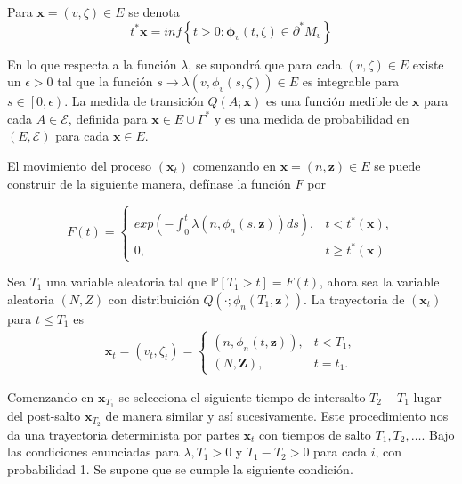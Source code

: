 \documentclass{article}
\newcommand{\prob}{\mathbb{P}}
\begin{document}
Para $\mathbf{x}=\left(v,\zeta\right)\in E$ se denota
\[t^{*}\mathbf{x}=inf\left\{t>0:\mathbf{\phi}_{v}\left(t,\zeta\right)\in\partial^{*}M_{v}\right\}\]

En lo que respecta a la funci\'on $\lambda$, se supondr\'a que
para cada $\left(v,\zeta\right)\in E$ existe un $\epsilon>0$ tal
que la funci\'on
$s\rightarrow\lambda\left(v,\phi_{v}\left(s,\zeta\right)\right)\in
E$ es integrable para $s\in\left[0,\epsilon\right)$. La medida de
transici\'on $Q\left(A;\mathbf{x}\right)$ es una funci\'on medible
de $\mathbf{x}$ para cada $A\in\mathcal{E}$, definida para
$\mathbf{x}\in E\cup\Gamma^{*}$ y es una medida de probabilidad en
$\left(E,\mathcal{E}\right)$ para cada $\mathbf{x}\in E$.

El movimiento del proceso $\left(\mathbf{x}_{t}\right)$ comenzando
en $\mathbf{x}=\left(n,\mathbf{z}\right)\in E$ se puede construir
de la siguiente manera, def\'inase la funci\'on $F$ por

\begin{equation}
F\left(t\right)=\left\{\begin{array}{ll}\\
exp\left(-\int_{0}^{t}\lambda\left(n,\phi_{n}\left(s,\mathbf{z}\right)\right)ds\right), & t<t^{*}\left(\mathbf{x}\right),\\
0, & t\geq t^{*}\left(\mathbf{x}\right)
\end{array}\right.
\end{equation}

Sea $T_{1}$ una variable aleatoria tal que
$\prob\left[T_{1}>t\right]=F\left(t\right)$, ahora sea la variable
aleatoria $\left(N,Z\right)$ con distribuici\'on
$Q\left(\cdot;\phi_{n}\left(T_{1},\mathbf{z}\right)\right)$. La
trayectoria de $\left(\mathbf{x}_{t}\right)$ para $t\leq T_{1}$ es
\begin{eqnarray*}
\mathbf{x}_{t}=\left(v_{t},\zeta_{t}\right)=\left\{\begin{array}{ll}
\left(n,\phi_{n}\left(t,\mathbf{z}\right)\right), & t<T_{1},\\
\left(N,\mathbf{Z}\right), & t=t_{1}.
\end{array}\right.
\end{eqnarray*}

Comenzando en $\mathbf{x}_{T_{1}}$ se selecciona el siguiente
tiempo de intersalto $T_{2}-T_{1}$ lugar del post-salto
$\mathbf{x}_{T_{2}}$ de manera similar y as\'i sucesivamente. Este
procedimiento nos da una trayectoria determinista por partes
$\mathbf{x}_{t}$ con tiempos de salto $T_{1},T_{2},\ldots$. Bajo
las condiciones enunciadas para $\lambda,T_{1}>0$  y
$T_{1}-T_{2}>0$ para cada $i$, con probabilidad 1. Se supone que
se cumple la siguiente condici\'on.
\end{document}
